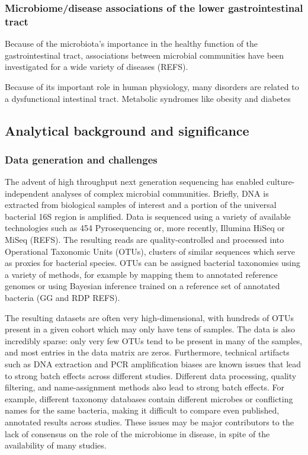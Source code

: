 \documentclass[12pt]{article}
\begin{document}
\subsubsection{Microbiome/disease associations of the lower gastrointestinal tract}
Because of the microbiota's importance in the healthy function of the 
gastrointestinal tract, associations between microbial communities 
have been investigated for a wide variety of diseases (REFS). 

Because of its important role in human physiology, many disorders are 
related to a dysfunctional intestinal tract. Metabolic syndromes like 
obesity and diabetes 

\subsection{Analytical background and significance}

\subsubsection{Data generation and challenges}
The advent of high throughput next generation sequencing has enabled 
culture-independent analyses of complex microbial communities. 
Briefly, DNA is extracted from biological samples of interest and a 
portion of the universal bacterial 16S region is amplified. Data is 
sequenced using a variety of available technologies such as 454 
Pyrosequencing or, more recently, Illumina HiSeq or MiSeq (REFS). The 
resulting reads are quality-controlled and processed into Operational 
Taxonomic Units (OTUs), clusters of similar sequences which serve as 
proxies for bacterial species. OTUs can be assigned bacterial 
taxonomies using a variety of methods, for example by mapping them to 
annotated reference genomes or using Bayesian inference trained on a 
reference set of annotated bacteria (GG and RDP REFS). 

The resulting datasets are often very high-dimensional, with hundreds 
of OTUs present in a given cohort which may only have tens of samples. 
The data is also incredibly sparse: only very few OTUs tend to be 
present in many of the samples, and most entries in the data matrix 
are zeros. Furthermore, technical artifacts such as DNA extraction and 
PCR amplification biases are known issues that lead to strong batch 
effects across different studies. Different data processing, quality 
filtering, and name-assignment methods also lead to strong batch 
effects. For example, different taxonomy databases contain different 
microbes or conflicting names for the same bacteria, making it 
difficult to compare even published, annotated results across studies.  
These issues may be major contributors to the lack of consensus on the 
role of the microbiome in disease, in spite of the availability of 
many studies.
\end{document}
